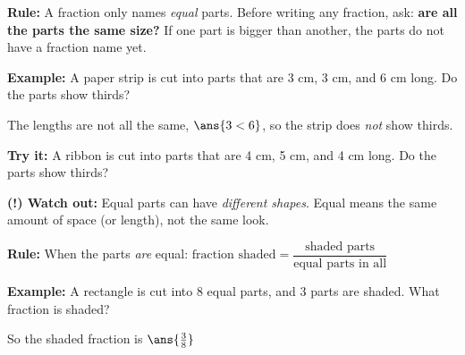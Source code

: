 \documentclass[12pt]{article}
\begin{document}


\begin{formulabox}
\textbf{Rule:} A fraction only names \emph{equal} parts. Before writing any
fraction, ask: \textbf{are all the parts the same size?} If one part is bigger
than another, the parts do not have a fraction name yet.
\end{formulabox}

\begin{examplebox}
\textbf{Example:} A paper strip is cut into parts that are 3 cm, 3 cm, and
6 cm long. Do the parts show thirds?

The lengths are not all the same, $\ans{3 < 6}$, so the strip does
\emph{not} show thirds.
\end{examplebox}

\begin{tryitbox}
\textbf{Try it:} A ribbon is cut into parts that are 4 cm, 5 cm, and 4 cm
long. Do the parts show thirds?\\[2pt]
\end{tryitbox}

\begin{watchoutbox}
\textbf{(!) Watch out:} Equal parts can have \emph{different shapes}. Equal
means the same amount of space (or length), not the same look.
\end{watchoutbox}


\begin{formulabox}
\textbf{Rule:} When the parts \emph{are} equal:
$\text{fraction shaded} = \dfrac{\text{shaded parts}}{\text{equal parts in all}}$
\end{formulabox}

\begin{examplebox}
\textbf{Example:} A rectangle is cut into 8 equal parts, and 3 parts are
shaded. What fraction is shaded?

So the shaded fraction is $\ans{\tfrac{3}{8}}$
\end{examplebox}
\end{document}
